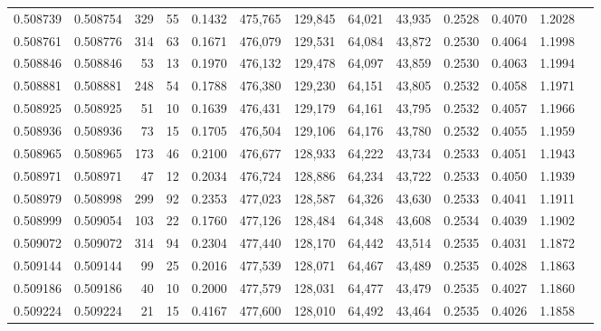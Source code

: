 \begin{tabular}{rrrrrrrrrrrrr}
0.508739 & 0.508754 &   329 &    55 &                                     0.1432 & 475,765 & 129,845 &  64,021 &  43,935 & 0.2528 & 0.4070 & 1.2028 \\
0.508761 & 0.508776 &   314 &    63 &                                     0.1671 & 476,079 & 129,531 &  64,084 &  43,872 & 0.2530 & 0.4064 & 1.1998 \\
0.508846 & 0.508846 &    53 &    13 &                                     0.1970 & 476,132 & 129,478 &  64,097 &  43,859 & 0.2530 & 0.4063 & 1.1994 \\
0.508881 & 0.508881 &   248 &    54 &                                     0.1788 & 476,380 & 129,230 &  64,151 &  43,805 & 0.2532 & 0.4058 & 1.1971 \\
0.508925 & 0.508925 &    51 &    10 &                                     0.1639 & 476,431 & 129,179 &  64,161 &  43,795 & 0.2532 & 0.4057 & 1.1966 \\
0.508936 & 0.508936 &    73 &    15 &                                     0.1705 & 476,504 & 129,106 &  64,176 &  43,780 & 0.2532 & 0.4055 & 1.1959 \\
0.508965 & 0.508965 &   173 &    46 &                                     0.2100 & 476,677 & 128,933 &  64,222 &  43,734 & 0.2533 & 0.4051 & 1.1943 \\
0.508971 & 0.508971 &    47 &    12 &                                     0.2034 & 476,724 & 128,886 &  64,234 &  43,722 & 0.2533 & 0.4050 & 1.1939 \\
0.508979 & 0.508998 &   299 &    92 &                                     0.2353 & 477,023 & 128,587 &  64,326 &  43,630 & 0.2533 & 0.4041 & 1.1911 \\
0.508999 & 0.509054 &   103 &    22 &                                     0.1760 & 477,126 & 128,484 &  64,348 &  43,608 & 0.2534 & 0.4039 & 1.1902 \\
0.509072 & 0.509072 &   314 &    94 &                                     0.2304 & 477,440 & 128,170 &  64,442 &  43,514 & 0.2535 & 0.4031 & 1.1872 \\
0.509144 & 0.509144 &    99 &    25 &                                     0.2016 & 477,539 & 128,071 &  64,467 &  43,489 & 0.2535 & 0.4028 & 1.1863 \\
0.509186 & 0.509186 &    40 &    10 &                                     0.2000 & 477,579 & 128,031 &  64,477 &  43,479 & 0.2535 & 0.4027 & 1.1860 \\
0.509224 & 0.509224 &    21 &    15 &                                     0.4167 & 477,600 & 128,010 &  64,492 &  43,464 & 0.2535 & 0.4026 & 1.1858 \\

\end{tabular}
